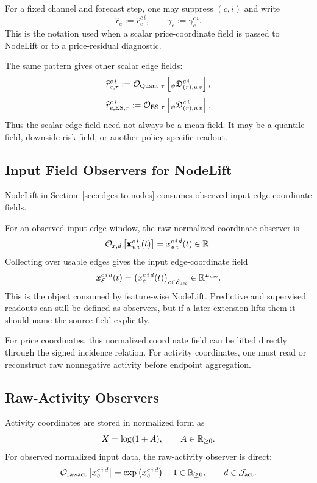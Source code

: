 For a fixed channel and forecast step, one may suppress $(c,i)$ and write
\[
  \widehat{r}_e
  :=
  \widehat{r}_{e}^{c\,i},
  \qquad
  \gamma_e
  :=
  \gamma_{e}^{c\,i}.
\]
This is the notation used when a scalar price-coordinate field is passed to
NodeLift or to a price-residual diagnostic.

The same pattern gives other scalar edge fields:
\[
  \widehat{r}_{e,\tau}^{c\,i}
  :=
  \mathcal{O}_{\operatorname{Quant}\,\tau}
  \left[
    {}_{\psi}\mathfrak{D}_{(r),u\,v}^{c\,i}
  \right],
\]
\[
  \widehat{r}_{e,\mathrm{ES},\tau}^{c\,i}
  :=
  \mathcal{O}_{\operatorname{ES}\,\tau}
  \left[
    {}_{\psi}\mathfrak{D}_{(r),u\,v}^{c\,i}
  \right].
\]
Thus the scalar edge field need not always be a mean field.  It may be a
quantile field, downside-risk field, or another policy-specific readout.

\subsection{Input Field Observers for NodeLift}
\label{subsec:edge-feature-field-observers-for-nodelift}

NodeLift in Section~\ref{sec:edges-to-nodes} consumes observed input
edge-coordinate fields.

For an observed input edge window, the raw normalized coordinate observer is
\[
  \mathcal{O}_{x,d}
  \left[
    \pmb{\mathbf{x}}_{u\,v}^{c\,i}(t)
  \right]
  =
  x_{u\,v}^{c\,i\,d}(t)
  \in\mathbb{R}.
\]
Collecting over usable edges gives the input edge-coordinate field
\[
  \bm{x}_{\mathcal{E}}^{c\,i\,d}(t)
  =
  \left(
    x_e^{c\,i\,d}(t)
  \right)_{e\in\mathcal{E}_{\mathrm{use}}}
  \in
  \mathbb{R}^{L_{\mathrm{use}}}.
\]
This is the object consumed by feature-wise NodeLift.  Predictive and
supervised readouts can still be defined as observers, but if a later extension
lifts them it should name the source field explicitly.

For price coordinates, this normalized coordinate field can be lifted directly
through the signed incidence relation.  For activity coordinates, one must read
or reconstruct raw nonnegative activity before endpoint aggregation.

\subsection{Raw-Activity Observers}
\label{subsec:raw-activity-observers}

Activity coordinates are stored in normalized form as
\[
  X=\log(1+A),
  \qquad
  A\in\mathbb{R}_{\ge 0}.
\]
For observed normalized input data, the raw-activity observer is direct:
\[
  \mathcal{O}_{\mathrm{rawact}}
  \left[
    x_e^{c\,i\,d}
  \right]
  =
  \exp
  \left(
    x_e^{c\,i\,d}
  \right)
  -
  1
  \in\mathbb{R}_{\ge 0},
  \qquad
  d\in\mathcal{J}_{\mathrm{act}}.
\]

